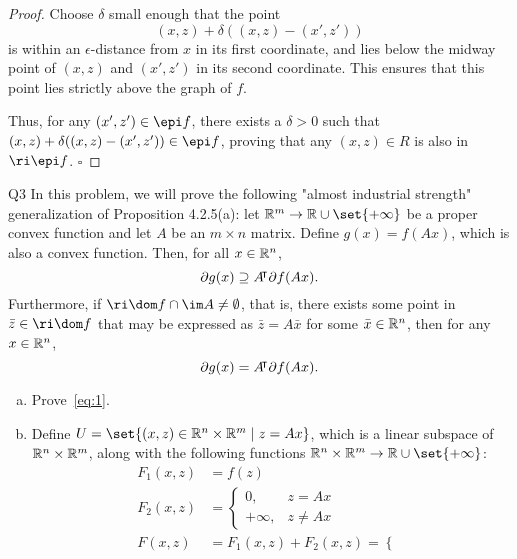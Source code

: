 \documentclass{article}
\begin{document}
\begin{solution}
\begin{enumerate}[(a)]
{\begin{proof}
                Choose $\delta$ small enough that the point
                \[ (x, z) + \delta((x, z) - (x', z')) \]
                is within an $\epsilon$-distance from $x$ in its first coordinate, and lies below the midway point of $(x, z)$ and $(x', z')$ in its second coordinate. This ensures that this point lies strictly above the graph of $f$.

                Thus, for any $(x', z') \in \epi f$, there exists a $\delta > 0$ such that $(x, z) + \delta((x, z) - (x', z')) \in \epi f$, proving that any $(x, z) \in R$ is also in $\ri\epi f$. \hfill $\square$
            \end{proof}
        }
    \end{enumerate}
\end{solution}

\begin{problem}
    {Q3}
    In this problem, we will prove the following "almost industrial strength" generalization of Proposition 4.2.5(a): let $\R^m\rightarrow\R\cup\set{+\infty}$ be a proper convex function and let $A$ be an $m\times n$ matrix. Define $g(x)=f(Ax)$, which is also a convex function. Then, for all $x\in \mathbb{R}^n$,
    \begin{equation}
        \partial g(x)\supseteq A{}^{\mkern-4mu\intercal}\partial f(Ax).\label{eq:1}
    \end{equation}
    Furthermore, if $\ri\dom f\cap\im A\neq\emptyset$, that is, there exists some point in $\bar{z}\in\ri\dom f$ that may be expressed as $\bar{z}=A\bar{x}$ for some $\bar{x}\in\mathbb{R}^n$, then for any $x\in\mathbb{R}^n$,
    \begin{equation}
        \partial g(x)=A{}^{\mkern-4mu\intercal}\partial f(Ax).\label{eq:2}
    \end{equation}
    \begin{enumerate}[(a)]
        \item Prove~\cref{eq:1}.
        \item Define $U=\set{(x,z)\in\R^n\times\R^m\mid z=Ax}$, which is a linear subspace of $\mathbb{R}^n\times\mathbb{R}^m$, along with the following functions $\R^n\times\R^m\rightarrow\R\cup\set{+\infty}$: {
            \begin{align*}
                F_1(x,z)&=f(z) \\
                F_2(x,z)&=\begin{cases}
                    0, & z=Ax \\
                    +\infty, & z\neq Ax
                \end{cases} \\
                F(x,z)&=F_1(x,z)+F_2(x,z)=\begin{cases}

\end{cases}
\end{align*}}
\end{enumerate}
\end{problem}
\end{document}

